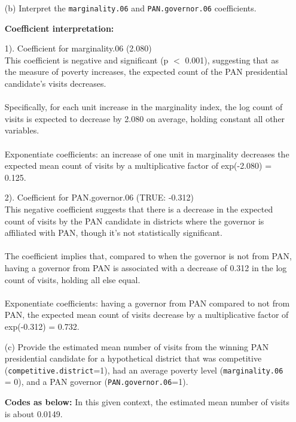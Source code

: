 \documentclass[12pt,a4paper]{article}
\begin{document}
\begin{enumerate}
	\item [(b)]
	Interpret the \texttt{marginality.06} and \texttt{PAN.governor.06} coefficients.
	
	\noindent \textbf{Coefficient interpretation:}
	
	1). Coefficient for marginality.06 (2.080)
	\\This coefficient is negative and significant (p $<$ 0.001), suggesting that as the measure of poverty  increases, the expected count of the PAN presidential candidate's visits decreases.\\ \\Specifically, for each unit increase in the marginality index, the log count of visits is expected to decrease by 2.080 on average, holding constant all other variables. \\\\Exponentiate  coefficients: an increase of one unit in marginality decreases the expected mean count of visits by a multiplicative factor of exp(-2.080) = 0.125.
	
	2). Coefficient for PAN.governor.06  (TRUE: -0.312)
	\\This negative coefficient suggests that there is a decrease in the expected count of visits by the PAN candidate in districts where the governor is affiliated with PAN, though it's not statistically significant. \\\\The coefficient implies that, compared to when the governor is not from PAN, having a governor from PAN is associated with a decrease of 0.312 in the log count of visits, holding all else equal. \\\\Exponentiate  coefficients: having a governor from PAN compared to not from PAN,  the expected mean count of visits decrease by a multiplicative factor of exp(-0.312) = 0.732.
	

	
	\item [(c)]
	Provide the estimated mean number of visits from the winning PAN presidential candidate for a hypothetical district that was competitive (\texttt{competitive.district}=1), had an average poverty level (\texttt{marginality.06} = 0), and a PAN governor (\texttt{PAN.governor.06}=1).
	
				\noindent \textbf{Codes as below:}
	\noindent In this given context, the estimated mean number of visits is about 0.0149.
	
\end{enumerate}
\end{document}
